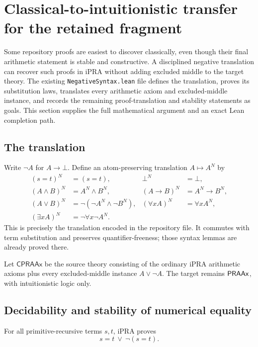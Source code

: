 \section{Classical-to-intuitionistic transfer for the retained fragment}
\label{sec:negative-transfer}

Some repository proofs are easiest to discover classically, even though their final arithmetic statement is stable and constructive.  A disciplined negative translation can recover such proofs in iPRA without adding excluded middle to the target theory.  The existing \texttt{NegativeSyntax.lean} file defines the translation, proves its substitution laws, translates every arithmetic axiom and excluded-middle instance, and records the remaining proof-translation and stability statements as goals.  This section supplies the full mathematical argument and an exact Lean completion path.

\subsection{The translation}

Write \(\neg A\) for \(A\to\bot\).  Define an atom-preserving translation \(A\mapsto A^N\) by
\begin{align*}
 (s=t)^N&=(s=t),& \bot^N&=\bot,\\
 (A\wedge B)^N&=A^N\wedge B^N,&
 (A\to B)^N&=A^N\to B^N,\\
 (A\vee B)^N&=\neg(\neg A^N\wedge\neg B^N),&
 (\forall x A)^N&=\forall x A^N,\\
 (\exists x A)^N&=\neg\forall x\neg A^N.
\end{align*}
This is precisely the translation encoded in the repository file.  It commutes with term substitution and preserves quantifier-freeness; those syntax lemmas are already proved there.

Let \(\mathsf{CPRAAx}\) be the source theory consisting of the ordinary iPRA arithmetic axioms plus every excluded-middle instance \(A\vee\neg A\).  The target remains \(\mathsf{PRAAx}\), with intuitionistic logic only.

\subsection{Decidability and stability of numerical equality}

\begin{lemma}
\label{lem:eq-decidable}
For all primitive-recursive terms \(s,t\), iPRA proves
\[
  s=t\ \vee\ \neg(s=t).
\]
\end{lemma}

